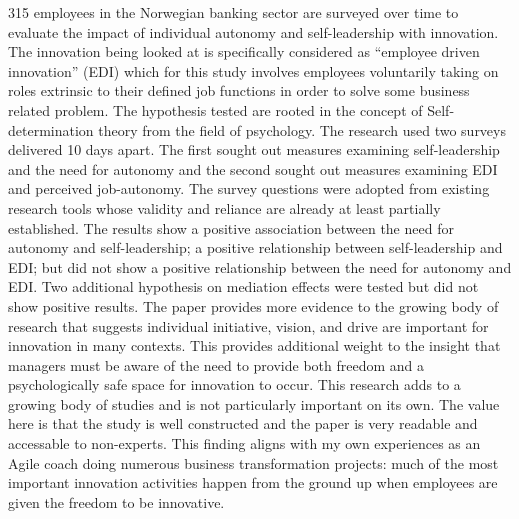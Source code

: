 \begin{adjustwidth}{1in}{}
  \begin{hangpara}{.25in}{1}
\end{hangpara}
\end{adjustwidth}
315 employees in the Norwegian banking sector are surveyed over time to evaluate the impact of individual autonomy and self-leadership with innovation. The innovation being looked at is specifically considered as ``employee driven innovation'' (EDI) which for this study involves employees voluntarily taking on roles extrinsic to their defined job functions in order to solve some business related problem. The hypothesis tested are rooted in the concept of Self-determination theory from the field of psychology. The research used two surveys delivered 10 days apart. The first sought out measures examining self-leadership and the need for autonomy and the second sought out measures examining EDI and perceived job-autonomy. The survey questions were adopted from existing research tools whose validity and reliance are already at least partially established. The results show a positive association between the need for autonomy and self-leadership; a positive relationship between self-leadership and EDI; but did not show a positive relationship between the need for autonomy and EDI. Two additional hypothesis on mediation effects were tested but did not show positive results. The paper provides more evidence to the growing body of research that suggests individual initiative, vision, and drive are important for innovation in many contexts. This provides additional weight to the insight that managers must be aware of the need to provide both freedom and a psychologically safe space for innovation to occur. This research adds to a growing body of studies and is not particularly important on its own. The value here is that the study is well constructed and the paper is very readable and accessable to non-experts. This finding aligns with my own experiences as an Agile coach doing numerous business transformation projects: much of the most important innovation activities happen from the ground up when employees are given the freedom to be innovative.


